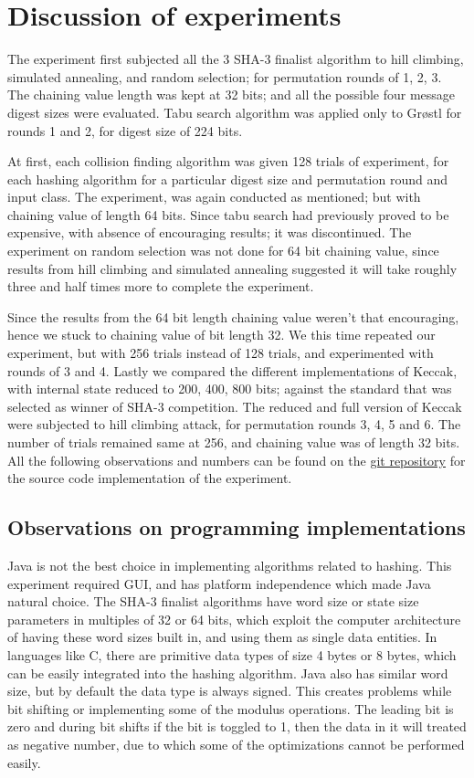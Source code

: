 \chapter{Discussion of experiments}

The experiment first subjected all the 3 SHA-3 finalist algorithm to hill climbing, simulated annealing, and
random selection; for permutation rounds of 1, 2, 3. The chaining value length was kept at 32 bits; and all
the possible four message digest sizes were evaluated. Tabu search algorithm was applied only to Gr{\o}stl
for rounds 1 and 2, for digest size of 224 bits. 

At first, each collision finding algorithm was given 128 trials of experiment, for each hashing algorithm for
a particular digest size and permutation round and input class. The experiment, was again conducted as mentioned;
but with chaining value of length 64 bits. Since tabu search had previously proved to be expensive, with absence 
of encouraging results; it was discontinued. The experiment on random selection was not done for 64 bit chaining
value, since results from hill climbing and simulated annealing suggested it will take roughly three and half times
more to complete the experiment. 

Since the results from the 64 bit length chaining value weren't that encouraging, hence we stuck to chaining 
value of bit length 32. We this time repeated our experiment, but with 256 trials instead of 128 trials, and 
experimented with rounds of 3 and 4. Lastly we compared the different implementations of Keccak, with internal
state reduced to 200, 400, 800 bits; against the standard that was selected as winner of SHA-3 competition. 
The reduced and full version of Keccak were subjected to hill climbing attack, for permutation rounds 3, 4, 5 and 
6. The number of trials remained same at 256, and chaining value was of length 32 bits. All the following 
observations and numbers can be found on the 
\href{https://github.com/sxs9174/MSProjectCode/tree/master/MSProjectCode/Output}{git repository} for the source
code implementation of the experiment.

\section{Observations on programming implementations}

Java is not the best choice in implementing algorithms related to hashing. This experiment required GUI, and has
platform independence which made Java natural choice. The SHA-3 finalist algorithms have word size or state size 
parameters in multiples of 32 or 64 bits, which exploit the computer architecture of having these word sizes
built in, and using them as single data entities. In languages like C, there are primitive data types
of size 4 bytes or 8 bytes, which can be easily integrated into the hashing algorithm. Java also has similar
word size, but by default the data type is always signed. This creates problems while bit shifting or implementing
some of the modulus operations. The leading bit is zero and during bit shifts if the bit is toggled to 1, then 
the data in it will treated as negative number, due to which some of the optimizations cannot be performed easily.

